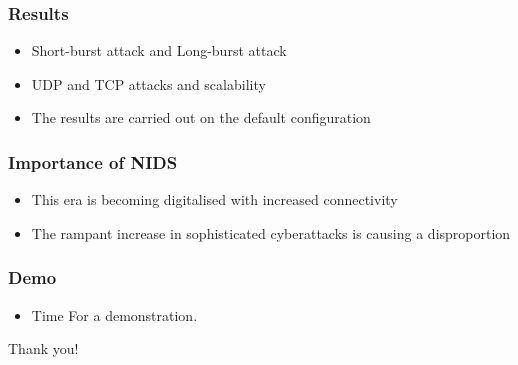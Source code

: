 \documentclass[12pt]{beamer}
\begin{document}
	\begin{frame}
		\frametitle{Results}
		\begin{itemize}
			\item Short-burst attack and Long-burst attack
			\item UDP and TCP attacks and scalability
			\item The results are carried out on the default configuration
		\end{itemize}
	\end{frame}
	
	
	
	\begin{frame}
		\frametitle{Importance of NIDS}
		\begin{itemize}
			\item  This era is becoming digitalised with  increased connectivity
			\item The rampant increase in sophisticated cyberattacks is causing a disproportion

		\end{itemize}
	\end{frame}
	
	
	\begin{frame}
		\frametitle{Demo}
		\begin{itemize}
			\item Time For a demonstration.
		\end{itemize}
	\end{frame}
	
	
	
	\begin{frame}
	\begin{center}
		Thank you!
	\end{center}

	\end{frame}
	
\end{document}

